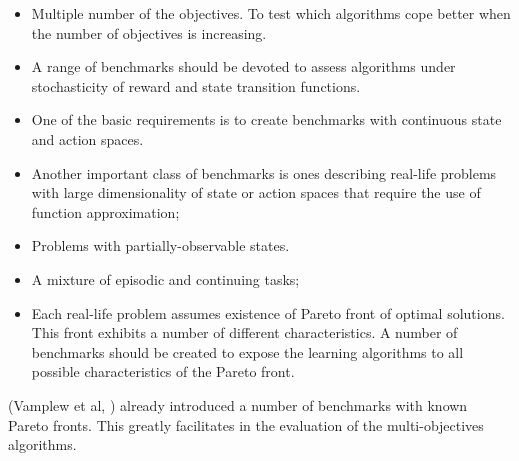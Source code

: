 \begin{itemize}

\item Multiple number of the objectives. To test which algorithms cope better when the number of objectives is increasing.

\item A range of benchmarks should be devoted to assess algorithms under stochasticity of reward and state transition functions.

\item One of the basic requirements is to create benchmarks with continuous state and action spaces.

\item Another important class of benchmarks is ones describing real-life problems with large dimensionality of state or action spaces that require the use of function approximation;

\item Problems with partially-observable states.

\item A mixture of episodic and continuing tasks;

\item Each real-life problem assumes existence of Pareto front of optimal solutions. This front exhibits a number of different characteristics. A number of benchmarks should be created to expose the learning algorithms to all possible characteristics of the Pareto front.

\end{itemize}

(Vamplew et al, \cite{VamplewDBID2011}) already introduced a number of benchmarks with known Pareto fronts. This greatly facilitates in the evaluation of the multi-objectives algorithms.

